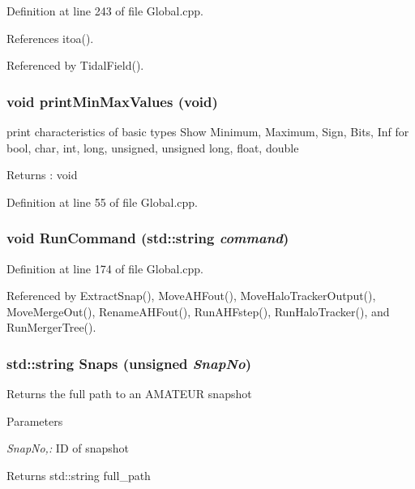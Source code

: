 Definition at line 243 of file Global.cpp.



References itoa().



Referenced by TidalField().

\subsubsection[{printMinMaxValues}]{\setlength{\rightskip}{0pt plus 5cm}void printMinMaxValues (void)}\label{Global_8h_a51dd29892ba6b6ec3e4075d2016d796a}


print characteristics of basic types Show Minimum, Maximum, Sign, Bits, Inf for bool, char, int, long, unsigned, unsigned long, float, double 

\begin{DoxyReturn}{Returns}
: void 
\end{DoxyReturn}


Definition at line 55 of file Global.cpp.

\subsubsection[{RunCommand}]{\setlength{\rightskip}{0pt plus 5cm}void RunCommand (std::string {\em command})}\label{Global_8h_af14ce9adc079d3106f6fe5ed977660a9}


Definition at line 174 of file Global.cpp.



Referenced by ExtractSnap(), MoveAHFout(), MoveHaloTrackerOutput(), MoveMergeOut(), RenameAHFout(), RunAHFstep(), RunHaloTracker(), and RunMergerTree().

\subsubsection[{Snaps}]{\setlength{\rightskip}{0pt plus 5cm}std::string Snaps (unsigned {\em SnapNo})}\label{Global_8h_ab95a6a07eed667f94b0951a15f1a9b0e}
Returns the full path to an AMATEUR snapshot 
\begin{DoxyParams}{Parameters}
\item[{\em SnapNo,:}]ID of snapshot \end{DoxyParams}
\begin{DoxyReturn}{Returns}
std::string full\_\-path 
\end{DoxyReturn}


